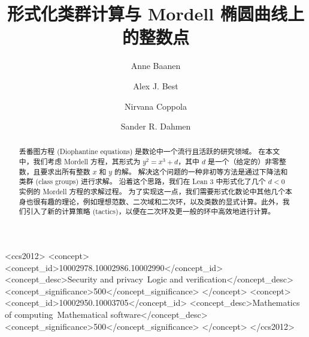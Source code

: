 \documentclass[sigplan,10pt,nonacm,
screen]{acmart} \settopmatter{printfolios=true,printccs=false,printacmref=false}
\begin{document}
\title{形式化类群计算与 Mordell 椭圆曲线上的整数点}

\author{Anne Baanen}
\author{Alex J. Best}
\author{Nirvana Coppola}
\author{Sander R. Dahmen}


\begin{abstract}
丢番图方程 (Diophantine equations) 是数论中一个流行且活跃的研究领域。
在本文中，我们考虑 Mordell 方程，其形式为 $y^2=x^3+d$，其中 $d$ 是一个（给定的）非零整数，且要求出所有整数 $x$ 和 $y$ 的解。
解决这个问题的一种非初等方法是通过下降法和类群 (class groups) 进行求解。
沿着这个思路，我们在 Lean 3 中形式化了几个 $d<0$ 实例的 Mordell 方程的求解过程。
为了实现这一点，我们需要形式化数论中其他几个本身也很有趣的理论，例如理想范数、二次域和二次环，以及类数的显式计算。此外，我们引入了新的计算策略 (tactics)，以便在二次环及更一般的环中高效地进行计算。
\end{abstract}

\begin{CCSXML}
<ccs2012>
<concept>
<concept_id>10002978.10002986.10002990</concept_id>
<concept_desc>Security and privacy~Logic and verification</concept_desc>
<concept_significance>500</concept_significance>
</concept>
<concept>
<concept_id>10002950.10003705</concept_id>
<concept_desc>Mathematics of computing~Mathematical software</concept_desc>
<concept_significance>500</concept_significance>
</concept>
</ccs2012>
\end{CCSXML}
\end{document}
